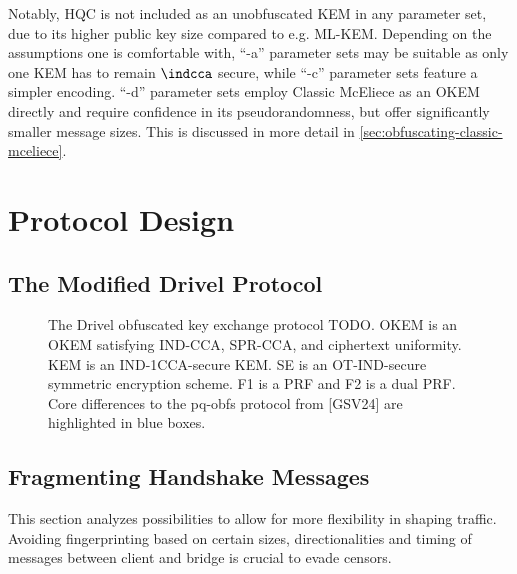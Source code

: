 Notably, HQC is not included as an unobfuscated KEM in any parameter set, due to its higher public key size compared to e.g. ML-KEM. Depending on the assumptions one is comfortable with, ``-a'' parameter sets may be suitable as only one KEM has to remain $\indcca$ secure, while ``-c'' parameter sets feature a simpler encoding. ``-d'' parameter sets employ Classic McEliece as an OKEM directly and require confidence in its pseudorandomness, but offer significantly smaller message sizes. This is discussed in more detail in \cref{sec:obfuscating-classic-mceliece}.

\section{Protocol Design} \label{sec:protocol-design}


\subsection{The Modified Drivel Protocol} \label{ssec:drivel}


\begin{figure}
    
    \caption[
        The modified drivel TODO.
    ]{
        The Drivel obfuscated key exchange protocol TODO.
        OKEM is an OKEM satisfying IND-CCA, SPR-CCA, and ciphertext uniformity.
        KEM is an IND-1CCA-secure KEM.
        SE is an OT-IND-secure symmetric encryption scheme.
        F1 is a PRF and F2 is a dual PRF.
        Core differences to the pq-obfs protocol from [GSV24] are highlighted in blue boxes.
    }
    \label{fig:modified-drivel}
\end{figure}

\subsection{Fragmenting Handshake Messages} \label{ssec:fragmentation}

This section analyzes possibilities to allow for more flexibility in shaping \drivel{} traffic. Avoiding fingerprinting based on certain sizes, directionalities and timing of messages between client and bridge is crucial to evade censors.

